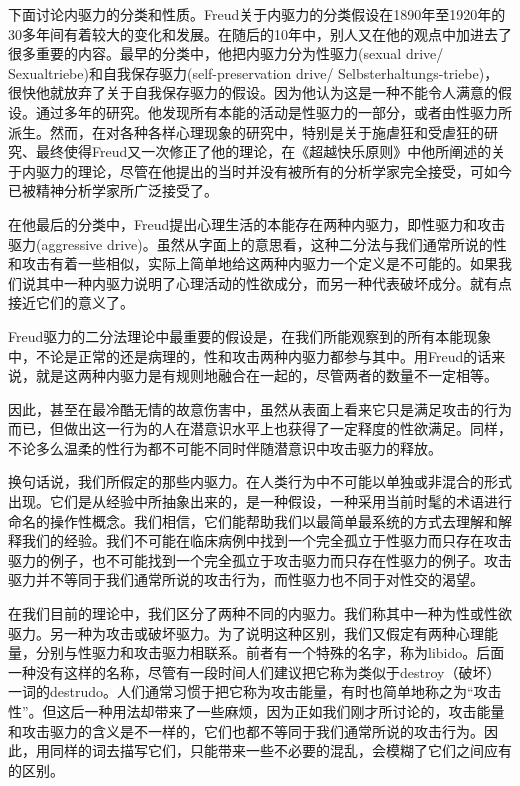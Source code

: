 \documentclass[UTF8,10pt,a4paper,openany]{book}
\begin{document}
下面讨论内驱力的分类和性质。Freud关于内驱力的分类假设在1890年至1920年的30多年间有着较大的变化和发展。在随后的10年中，别人又在他的观点中加进去了很多重要的内容。最早的分类中，他把内驱力分为性驱力(sexual drive/ Sexualtriebe)和自我保存驱力(self-preservation drive/ Selbsterhaltungs-triebe)，很快他就放弃了关于自我保存驱力的假设。因为他认为这是一种不能令人满意的假设。通过多年的研究。他发现所有本能的活动是性驱力的一部分，或者由性驱力所派生。然而，在对各种各样心理现象的研究中，特别是关于施虐狂和受虐狂的研究、最终使得Freud又一次修正了他的理论，在《超越快乐原则》中他所阐述的关于内驱力的理论，尽管在他提出的当时并没有被所有的分析学家完全接受，可如今已被精神分析学家所广泛接受了。

在他最后的分类中，Freud提出心理生活的本能存在两种内驱力，即性驱力和攻击驱力(aggressive drive)。虽然从字面上的意思看，这种二分法与我们通常所说的性和攻击有着一些相似，实际上简单地给这两种内驱力一个定义是不可能的。如果我们说其中一种内驱力说明了心理活动的性欲成分，而另一种代表破坏成分。就有点接近它们的意义了。

Freud驱力的二分法理论中最重要的假设是，在我们所能观察到的所有本能现象中，不论是正常的还是病理的，性和攻击两种内驱力都参与其中。用Freud的话来说，就是这两种内驱力是有规则地融合在一起的，尽管两者的数量不一定相等。

因此，甚至在最冷酷无情的故意伤害中，虽然从表面上看来它只是满足攻击的行为而已，但做出这一行为的人在潜意识水平上也获得了一定释度的性欲满足。同样，不论多么温柔的性行为都不可能不同时伴随潜意识中攻击驱力的释放。

换句话说，我们所假定的那些内驱力。在人类行为中不可能以单独或非混合的形式出现。它们是从经验中所抽象出来的，是一种假设，一种采用当前时髦的术语进行命名的操作性概念。我们相信，它们能帮助我们以最简单最系统的方式去理解和解释我们的经验。我们不可能在临床病例中找到一个完全孤立于性驱力而只存在攻击驱力的例子，也不可能找到一个完全孤立于攻击驱力而只存在性驱力的例子。攻击驱力并不等同于我们通常所说的攻击行为，而性驱力也不同于对性交的渴望。

在我们目前的理论中，我们区分了两种不同的内驱力。我们称其中一种为性或性欲驱力。另一种为攻击或破坏驱力。为了说明这种区别，我们又假定有两种心理能量，分别与性驱力和攻击驱力相联系。前者有一个特殊的名字，称为libido。后面一种没有这样的名称，尽管有一段时间人们建议把它称为类似于destroy（破坏）一词的destrudo。人们通常习惯于把它称为攻击能量，有时也简单地称之为“攻击性”。但这后一种用法却带来了一些麻烦，因为正如我们刚才所讨论的，攻击能量和攻击驱力的含义是不一样的，它们也都不等同于我们通常所说的攻击行为。因此，用同样的词去描写它们，只能带来一些不必要的混乱，会模糊了它们之间应有的区别。
\end{document}
